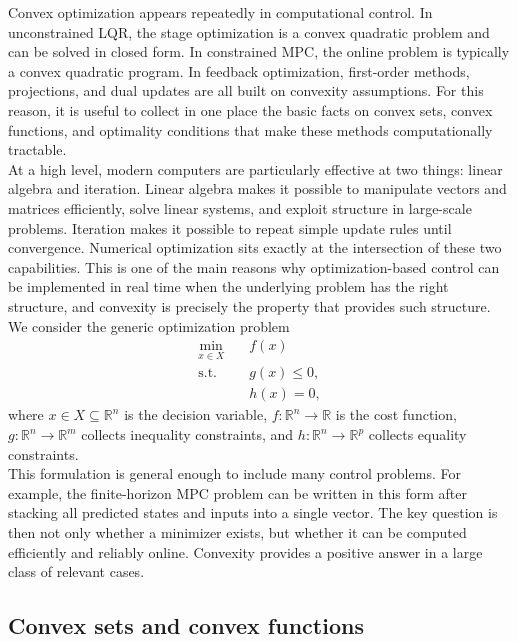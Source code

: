 Convex optimization appears repeatedly in computational control. In unconstrained LQR, the stage optimization is a convex quadratic problem and can be solved in closed form. In constrained MPC, the online problem is typically a convex quadratic program. In feedback optimization, first-order methods, projections, and dual updates are all built on convexity assumptions. For this reason, it is useful to collect in one place the basic facts on convex sets, convex functions, and optimality conditions that make these methods computationally tractable.\\

At a high level, modern computers are particularly effective at two things: linear algebra and iteration. Linear algebra makes it possible to manipulate vectors and matrices efficiently, solve linear systems, and exploit structure in large-scale problems. Iteration makes it possible to repeat simple update rules until convergence. Numerical optimization sits exactly at the intersection of these two capabilities. This is one of the main reasons why optimization-based control can be implemented in real time when the underlying problem has the right structure, and convexity is precisely the property that provides such structure.\\

We consider the generic optimization problem
\begin{equation}
\begin{aligned}
    \min_{x \in X} \quad & f(x) \\
    \text{s.t.} \quad & g(x) \leq 0, \\
                      & h(x) = 0,
\end{aligned}
\label{eq:generic_opt_problem}
\end{equation}
where $x \in X \subseteq \mathbb{R}^n$ is the decision variable, $f : \mathbb{R}^n \to \mathbb{R}$ is the cost function, $g : \mathbb{R}^n \to \mathbb{R}^m$ collects inequality constraints, and $h : \mathbb{R}^n \to \mathbb{R}^p$ collects equality constraints.\\
This formulation is general enough to include many control problems. For example, the finite-horizon MPC problem can be written in this form after stacking all predicted states and inputs into a single vector. The key question is then not only whether a minimizer exists, but whether it can be computed efficiently and reliably online. Convexity provides a positive answer in a large class of relevant cases.

\subsection{Convex sets and convex functions}

